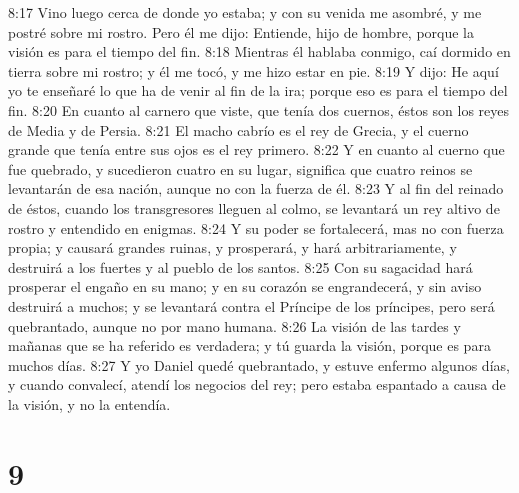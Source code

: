 8:17 Vino luego cerca de donde yo estaba; y con su venida me asombré, y me postré sobre mi rostro. Pero él me dijo: Entiende, hijo de hombre, porque la visión es para el tiempo del fin.  
8:18 Mientras él hablaba conmigo, caí dormido en tierra sobre mi rostro; y él me tocó, y me hizo estar en pie.  
8:19 Y dijo: He aquí yo te enseñaré lo que ha de venir al fin de la ira; porque eso es para el tiempo del fin.  
8:20 En cuanto al carnero que viste, que tenía dos cuernos, éstos son los reyes de Media y de Persia.  
8:21 El macho cabrío es el rey de Grecia, y el cuerno grande que tenía entre sus ojos es el rey primero.  
8:22 Y en cuanto al cuerno que fue quebrado, y sucedieron cuatro en su lugar, significa que cuatro reinos se levantarán de esa nación, aunque no con la fuerza de él.  
8:23 Y al fin del reinado de éstos, cuando los transgresores lleguen al colmo, se levantará un rey altivo de rostro y entendido en enigmas.  
8:24 Y su poder se fortalecerá, mas no con fuerza propia; y causará grandes ruinas, y prosperará, y hará arbitrariamente, y destruirá a los fuertes y al pueblo de los santos.  
8:25 Con su sagacidad hará prosperar el engaño en su mano; y en su corazón se engrandecerá, y sin aviso destruirá a muchos; y se levantará contra el Príncipe de los príncipes, pero será quebrantado, aunque no por mano humana.  
8:26 La visión de las tardes y mañanas que se ha referido es verdadera; y tú guarda la visión, porque es para muchos días.  
8:27 Y yo Daniel quedé quebrantado, y estuve enfermo algunos días, y cuando convalecí, atendí los negocios del rey; pero estaba espantado a causa de la visión, y no la entendía.  

\chapter{9}

